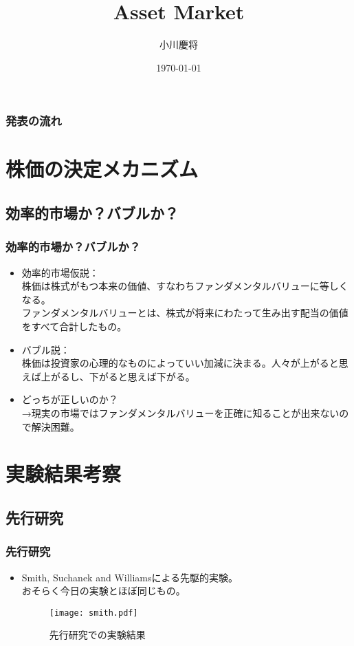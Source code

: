 \documentclass[dvipdfmx,12pt]{beamer}
\title{Asset Market}
\author{小川慶将}
\date{\today}
\begin{document}
\begin{frame}\frametitle{}
 \titlepage
\end{frame}

\begin{frame}\frametitle{発表の流れ}
 \tableofcontents
\end{frame}

\section{株価の決定メカニズム}
\subsection{効率的市場か？バブルか？}
\begin{frame}
\frametitle{効率的市場か？バブルか？}
\begin{itemize}\setlength{\parskip}{0.5em}
\item
効率的市場仮説：\\
株価は株式がもつ本来の価値、すなわちファンダメンタルバリューに等しくなる。\\
ファンダメンタルバリューとは、株式が将来にわたって生み出す配当の価値をすべて合計したもの。
\item
バブル説：\\
株価は投資家の心理的なものによっていい加減に決まる。人々が上がると思えば上がるし、下がると思えば下がる。
\item
どっちが正しいのか？\\
→現実の市場ではファンダメンタルバリューを正確に知ることが出来ないので解決困難。
\end{itemize}
\end{frame}

\section{実験結果考察}
\subsection{先行研究}
\begin{frame}
\frametitle{先行研究}
\begin{itemize}\setlength{\parskip}{0.5em}
\item
Smith, Suchanek and Williamsによる先駆的実験。\\
おそらく今日の実験とほぼ同じもの。
\begin{figure}
\centering
\texttt{[image: smith.pdf]}
\caption{先行研究での実験結果}
\label{fig:bubble}
\end{figure}
\end{itemize}
\end{frame}
\end{document}
